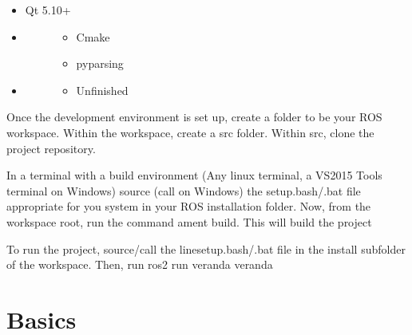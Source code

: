 \documentclass[letterpaper,10pt,english]{sphinxmanual}
\begin{document}
\begin{itemize}
\item {} 
Qt 5.10+

\item {} \begin{description}
\item[{}] \leavevmode\begin{itemize}
\item {} 
Cmake

\item {} 
pyparsing

\end{itemize}

\end{description}

\item {} \begin{description}
\item[{}] \leavevmode\begin{itemize}
\item {} 
Unfinished

\end{itemize}

\end{description}

\end{itemize}


Once the development environment is set up, create a folder to be your ROS workspace.
Within the workspace, create a src folder. Within src, clone the
project repository.


In a terminal with a build environment (Any linux terminal, a VS2015 Tools terminal on
Windows) source (call on Windows) the setup.bash/.bat file appropriate for you system in
your ROS installation folder. Now, from the workspace root, run the command ament build.
This will build the project


To run the project, source/call the line\textbar{}setup.bash/.bat file in the install subfolder
of the workspace. Then, run ros2 run veranda veranda


\chapter{Basics}
\label{\detokenize{index:basics}}
\end{document}
